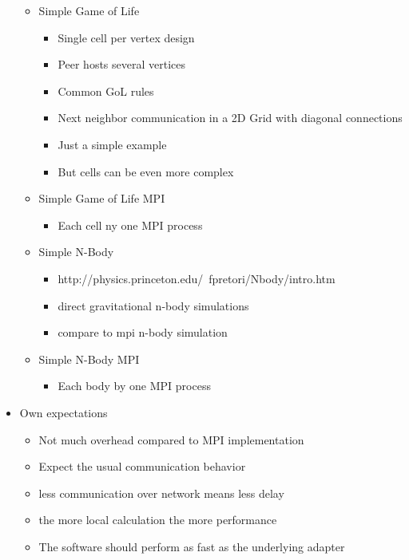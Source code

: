 \begin{itemize}
\begin{itemize}
  \item Simple Game of Life
    \begin{itemize}
    \item Single cell per vertex design
    \item Peer hosts several vertices
    \item Common GoL rules
    \item Next neighbor communication in a 2D Grid with diagonal connections
    \item Just a simple example
    \item But cells can be even more complex
    \end{itemize}

  \item Simple Game of Life MPI 
    \begin{itemize}
    \item Each cell ny one MPI process
    \end{itemize}

  \item Simple N-Body
    \begin{itemize}
    \item http://physics.princeton.edu/~fpretori/Nbody/intro.htm
    \item direct gravitational n-body simulations
    \item compare to mpi n-body simulation
    \end{itemize}

  \item Simple N-Body MPI
    \begin{itemize}
      \item Each body by one MPI process
    \end{itemize}
  \end{itemize}

\item Own expectations
  \begin{itemize}
  \item Not much overhead compared to MPI implementation
  \item Expect the usual communication behavior
  \item less communication over network means less delay
  \item the more local calculation the more performance
  \item The software should perform as fast as the
    underlying adapter
  \end{itemize}


\end{itemize}
